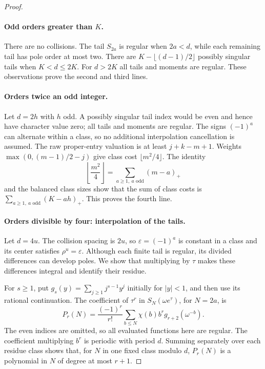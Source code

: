 \documentclass[11pt,letterpaper]{article}
\numberwithin{equation}{section}
\theoremstyle{remark}\newtheorem{remark}[theorem]{Remark}
\begin{document}
\begin{proof}
\paragraph{Odd orders greater than $K$.}
There are no collisions. The tail $S_{2a}$ is regular when $2a<d$, while each remaining tail has pole order at most two. There are $K-\lfloor(d-1)/2\rfloor$ possibly singular tails when $K<d\le2K$. For $d>2K$ all tails and moments are regular. These observations prove the second and third lines.

\paragraph{Orders twice an odd integer.}
Let $d=2h$ with $h$ odd. A possibly singular tail index would be even and hence have character value zero; all tails and moments are regular. The signs $(-1)^a$ can alternate within a class, so no additional interpolation cancellation is assumed. The raw proper-entry valuation is at least $j+k-m+1$. Weights $\max(0,(m-1)/2-j)$ give class cost $\lfloor m^2/4\rfloor$. The identity
\begin{equation*}
 \left\lfloor\frac{m^2}{4}\right\rfloor
 =\sum_{a\ge1,\ a\text{ odd}}(m-a)_+
\end{equation*}
and the balanced class sizes show that the sum of class costs is
$\sum_{a\ge1,\ a\text{ odd}}(K-ah)_+$. This proves the fourth line.

\paragraph{Orders divisible by four: interpolation of the tails.}
Let $d=4u$. The collision spacing is $2u$, so $\varepsilon=(-1)^a$ is constant in a class and its center satisfies $\rho^u=\varepsilon$. Although each finite tail is regular, its divided differences can develop poles. We show that multiplying by $\tau$ makes these differences integral and identify their residue.

For $s\ge1$, put $g_s(y)=\sum_{j\ge1}j^{s-1}y^j$ initially for $|y|<1$, and then use its rational continuation. The coefficient of $\tau^r$ in $S_N(\omega e^\tau)$, for $N=2a$, is
\begin{equation}\label{eq:periodsum}
 P_r(N)=\frac{(-1)^r}{r!}\sum_{b\le N}\chi(b)b^r g_{r+2}(\omega^{-b}).
\end{equation}
The even indices are omitted, so all evaluated functions here are regular. The coefficient multiplying $b^r$ is periodic with period $d$. Summing separately over each residue class shows that, for $N$ in one fixed class modulo $d$, $P_r(N)$ is a polynomial in $N$ of degree at most $r+1$.


\end{proof}
\end{document}
